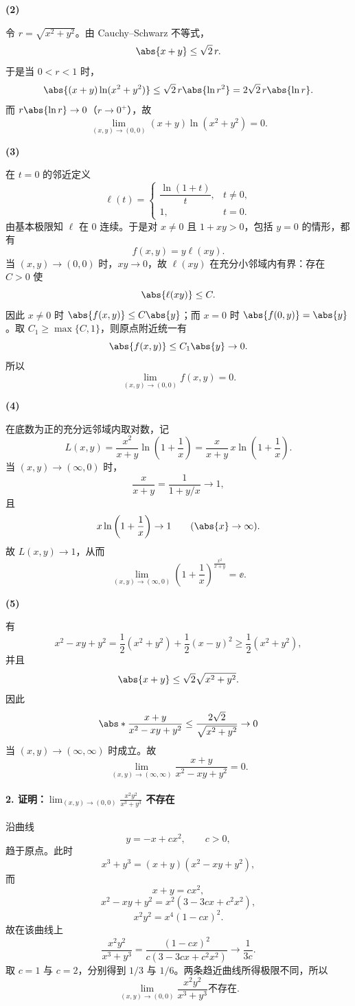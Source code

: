 \textbf{(2)}
\begin{xsolution}
令 $r=\sqrt{x^2+y^2}$。由 Cauchy--Schwarz 不等式，
\[
  \abs{x+y}\le\sqrt2\,r.
\]
于是当 $0<r<1$ 时，
\[
  \abs{(x+y)\ln(x^2+y^2)}
  \le
  \sqrt2\,r\abs{\ln r^2}
  =2\sqrt2\,r\abs{\ln r}.
\]
而 $r\abs{\ln r}\to0$（$r\to0^+$），故
\[
  \boxed{\displaystyle
  \lim_{(x,y)\to(0,0)}(x+y)\ln(x^2+y^2)=0}.
\]
\end{xsolution}

\textbf{(3)}
\begin{xsolution}
在 $t=0$ 的邻近定义
\[
  \ell(t)=
  \begin{cases}
    \dfrac{\ln(1+t)}{t}, & t\ne0,\\[4pt]
    1, & t=0.
  \end{cases}
\]
由基本极限知 $\ell$ 在 $0$ 连续。于是对 $x\ne0$ 且 $1+xy>0$，包括 $y=0$ 的情形，都有
\[
  f(x,y)=y\ell(xy).
\]
当 $(x,y)\to(0,0)$ 时，$xy\to0$，故 $\ell(xy)$ 在充分小邻域内有界：存在 $C>0$ 使
\[
  \abs{\ell(xy)}\le C.
\]
因此 $x\ne0$ 时 $\abs{f(x,y)}\le C\abs{y}$；而 $x=0$ 时 $\abs{f(0,y)}=\abs{y}$。取 $C_1\ge\max\{C,1\}$，则原点附近统一有
\[
  \abs{f(x,y)}\le C_1\abs{y}\to0.
\]
所以
\[
  \boxed{\displaystyle
  \lim_{(x,y)\to(0,0)}f(x,y)=0}.
\]
\end{xsolution}

\textbf{(4)}
\begin{xsolution}
在底数为正的充分远邻域内取对数，记
\[
  L(x,y)
  =\frac{x^2}{x+y}\ln\left(1+\frac1x\right)
  =\frac{x}{x+y}\,x\ln\left(1+\frac1x\right).
\]
当 $(x,y)\to(\infty,0)$ 时，
\[
  \frac{x}{x+y}=\frac1{1+y/x}\to1,
\]
且
\[
  x\ln\left(1+\frac1x\right)\to1
  \qquad(\abs{x}\to\infty).
\]
故 $L(x,y)\to1$，从而
\[
  \boxed{\displaystyle
  \lim_{(x,y)\to(\infty,0)}
  \left(1+\frac1x\right)^{\frac{x^2}{x+y}}
  =\ee}.
\]
\end{xsolution}

\textbf{(5)}
\begin{xsolution}
有
\[
  x^2-xy+y^2
  =\frac12(x^2+y^2)+\frac12(x-y)^2
  \ge\frac12(x^2+y^2),
\]
并且
\[
  \abs{x+y}\le\sqrt2\sqrt{x^2+y^2}.
\]
因此
\[
  \abs*{\frac{x+y}{x^2-xy+y^2}}
  \le
  \frac{2\sqrt2}{\sqrt{x^2+y^2}}\to0
\]
当 $(x,y)\to(\infty,\infty)$ 时成立。故
\[
  \boxed{\displaystyle
  \lim_{(x,y)\to(\infty,\infty)}
  \frac{x+y}{x^2-xy+y^2}=0}.
\]
\end{xsolution}

\paragraph{2. 证明：$\displaystyle\lim_{(x,y)\to(0,0)}\frac{x^2y^2}{x^3+y^3}$ 不存在}
\begin{xsolution}
沿曲线
\[
  y=-x+cx^2,
  \qquad c>0,
\]
趋于原点。此时
\[
  x^3+y^3=(x+y)(x^2-xy+y^2),
\]
而
\[
  x+y=cx^2,
\]
\[
  x^2-xy+y^2=x^2(3-3cx+c^2x^2),
\]
\[
  x^2y^2=x^4(1-cx)^2.
\]
故在该曲线上
\[
  \frac{x^2y^2}{x^3+y^3}
  =\frac{(1-cx)^2}{c(3-3cx+c^2x^2)}
  \longrightarrow\frac1{3c}.
\]
取 $c=1$ 与 $c=2$，分别得到 $1/3$ 与 $1/6$。两条趋近曲线所得极限不同，所以
\[
  \boxed{\displaystyle
  \lim_{(x,y)\to(0,0)}\frac{x^2y^2}{x^3+y^3}
  \text{不存在}}.
\]
\end{xsolution}

